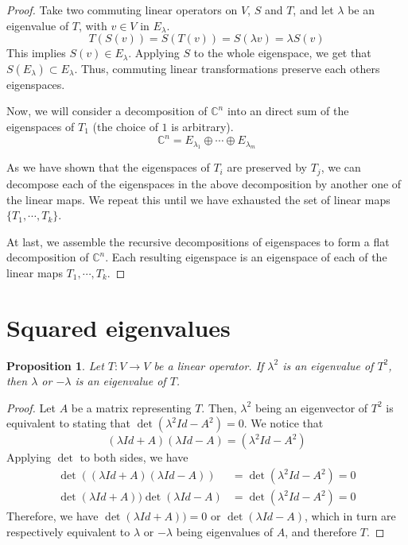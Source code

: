 \documentclass{article}
\newtheorem{proposition}{Proposition}
\begin{document}
\begin{proof}
    Take two commuting linear operators on $V$, $S$ and $T$, and let $\lambda$
    be an eigenvalue of $T$, with $v \in V$ in $E_\lambda$.
    \begin{equation}
        T(S(v)) = S(T(v)) = S(\lambda v) = \lambda S(v)
    \end{equation}
    This implies $S(v) \in E_\lambda$. Applying $S$ to the whole eigenspace, we
    get that $S(E_\lambda) \subset E_\lambda$. Thus, commuting linear
    transformations preserve each others eigenspaces.

    Now, we will consider a decomposition of $\mathbb{C}^n$ into an direct sum
    of the eigenspaces of $T_1$ (the choice of $1$ is arbitrary).
    $$\mathbb{C}^n = E_{\lambda_1} \oplus \cdots \oplus E_{\lambda_m}$$

    As we have shown that the eigenspaces of $T_i$ are preserved by $T_j$, we
    can decompose each of the eigenspaces in the above decomposition by another
    one of the linear maps. We repeat this until we have exhausted the set of
    linear maps $\{T_1, \cdots, T_k\}$.

    At last, we assemble the recursive decompositions of eigenspaces to form
    a flat decomposition of $\mathbb{C}^n$. Each resulting eigenspace is an
    eigenspace of each of the linear maps $T_1, \cdots, T_k$.
\end{proof}

\section{Squared eigenvalues}

\begin{proposition}
    Let $T : V \to V$ be a linear operator. If $\lambda^2$ is an eigenvalue of
    $T^2$, then $\lambda$ or $-\lambda$ is an eigenvalue of $T$.
\end{proposition}

\begin{proof}
    Let $A$ be a matrix representing $T$. Then, $\lambda^2$ being an
    eigenvector of $T^2$ is equivalent to stating that
    $\det{(\lambda^2 Id - A^2)} = 0$. We notice that
    $$(\lambda Id + A)(\lambda Id - A) = (\lambda^2 Id - A^2)$$
    Applying $\det$ to both sides, we have
    \begin{align*}
        \det{((\lambda Id + A)(\lambda Id - A))}
            &= \det{(\lambda^2 Id - A^2)} = 0 \\
        \det{(\lambda Id + A))} \det{(\lambda Id - A)}
            &= \det{(\lambda^2 Id - A^2)} = 0
    \end{align*}
    Therefore, we have $\det{(\lambda Id + A))} = 0$ or
    $\det{(\lambda Id - A)}$, which in turn are respectively equivalent to
    $\lambda$ or $-\lambda$ being eigenvalues of $A$, and therefore $T$.
\end{proof}
\end{document}
